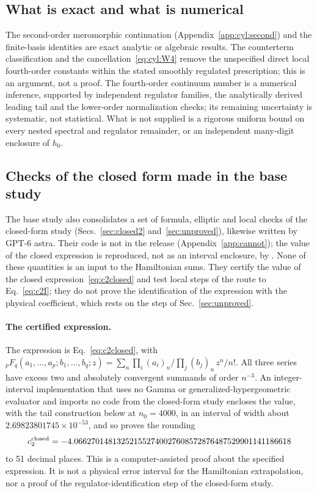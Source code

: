 \documentclass[11pt,a4paper]{article}
\numberwithin{equation}{section}
\newcommand{\file}[1]{\path{#1}}
\newcommand{\sci}[2]{#1\times10^{#2}}
\begin{document}
\subsection{What is exact and what is numerical}\label{app:cyl:status}
The second-order meromorphic continuation (Appendix~\ref{app:cyl:second}) and the finite-basis identities are exact
analytic or algebraic results. The counterterm classification and the cancellation~\eqref{eq:cyl:W4} remove the
unspecified direct local fourth-order constants within the stated smoothly regulated prescription; this is an
argument, not a proof. The fourth-order continuum number is a numerical inference, supported by independent regulator
families, the analytically derived leading tail and the lower-order normalization checks; its remaining uncertainty is
systematic, not statistical. What is not supplied is a rigorous
uniform bound on every nested spectral and regulator remainder, or an independent many-digit enclosure of $h_0$.

\subsection{Checks of the closed form made in the base study}\label{app:cyl:closedchecks}
The base study also consolidates a set of formula, elliptic and local checks of the closed-form study
(Secs.~\ref{sec:closed2} and~\ref{sec:unproved}), likewise written by GPT-6 astra. Their code is not in the release
(Appendix~\ref{app:cannot}); the value of the closed expression is reproduced, not as an interval enclosure, by
\file{c2_closed_d2}. None of these quantities is an input
to the Hamiltonian sums. They certify the value of the closed expression~\eqref{eq:c2closed} and test local steps of
the route to Eq.~\eqref{eq:c2I}; they do not prove the identification of the expression with the physical coefficient,
which rests on the step of Sec.~\ref{sec:unproved}.

\paragraph{The certified expression.} The expression is Eq.~\eqref{eq:c2closed}, with
${}_pF_q(a_1,\ldots,a_p;b_1,\ldots,b_q;z)=\sum_n\prod_i(a_i)_n/\prod_j(b_j)_n\,z^n/n!$. All three series have excess
two and absolutely convergent summands of order $n^{-3}$. An integer-interval implementation that uses no Gamma or
generalized-hypergeometric evaluator and imports no code from the closed-form study encloses the value, with the tail
construction below at $n_0=4000$, in an interval of width about $\sci{2.69823801745}{-53}$, and so proves the rounding
\begin{equation}
 c_2^{\rm closed}=-4.066270148132521552740027608572876487529901141186618
 \label{eq:cyl:certified}
\end{equation}
to 51 decimal places. This is a computer-assisted proof about the specified expression. It is not a physical error
interval for the Hamiltonian extrapolation, nor a proof of the regulator-identification step of the closed-form study.
\end{document}
